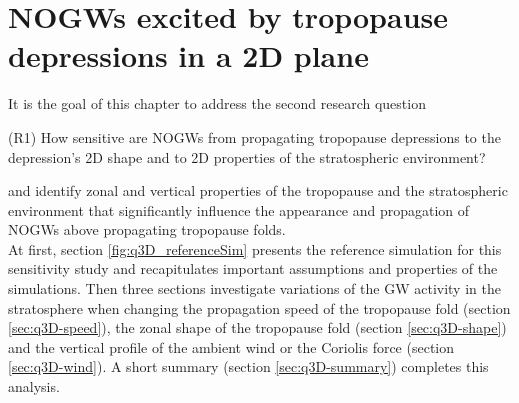 \chapter{NOGWs excited by tropopause depressions in a 2D plane}
\label{sec:resultsQ3D}
It is the goal of this chapter to address the second research question
\begin{tcolorbox}[]
    (R1) How sensitive are NOGWs from propagating tropopause depressions to the depression's 2D shape and to 2D properties of the stratospheric environment?
\end{tcolorbox}
\noindent and identify zonal and vertical properties of the tropopause and the stratospheric environment that significantly influence the appearance and propagation of NOGWs above propagating tropopause folds. \\
At first, section \ref{fig:q3D_referenceSim} presents the reference simulation for this sensitivity study and recapitulates important assumptions and properties of the simulations. Then three sections investigate variations of the GW activity in the stratosphere when changing the propagation speed of the tropopause fold (section \ref{sec:q3D-speed}), the zonal shape of the tropopause fold (section \ref{sec:q3D-shape}) and the vertical profile of the ambient wind or the Coriolis force (section \ref{sec:q3D-wind}). A short summary (section \ref{sec:q3D-summary}) completes this analysis. 

